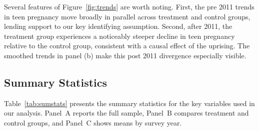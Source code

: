 \documentclass[12pt,a4paper]{article}
\begin{document}
\noindent Several features of Figure~\ref{fig:trends} are worth noting. First, the pre 2011 trends in teen pregnancy move broadly in parallel across treatment and control groups, lending support to our key identifying assumption. Second, after 2011, the treatment group experiences a noticeably steeper decline in teen pregnancy relative to the control group, consistent with a causal effect of the uprising. The smoothed trends in panel (b) make this post 2011 divergence especially visible.
\vspace{0.25cm}

\subsection{Summary Statistics}

Table~\ref{tab:sumstats} presents the summary statistics for the key variables used in our analysis. Panel~A reports the full sample, Panel~B compares treatment and control groups, and Panel~C shows means by survey year.
\vspace{0.25cm}
\end{document}
